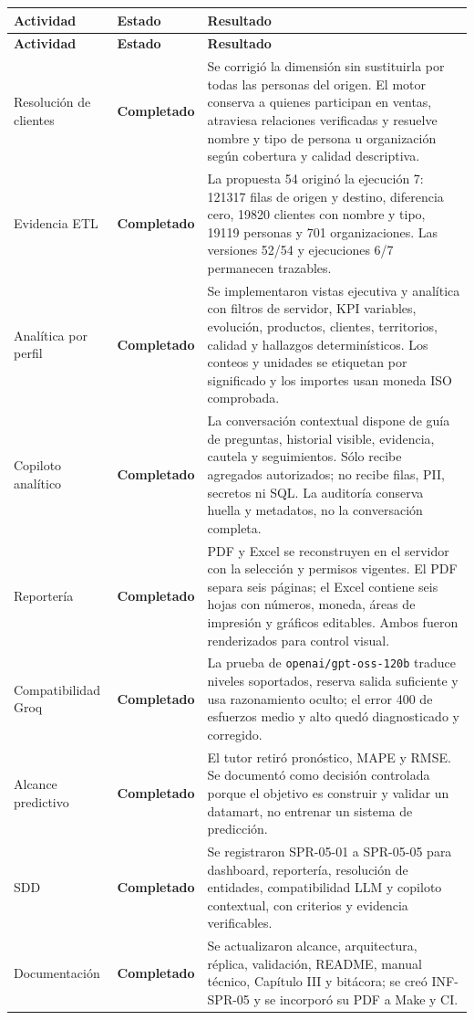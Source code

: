 \documentclass[11pt,letterpaper]{article}
\newcommand{\statusok}{\textcolor{deepgreen}{\textbf{Completado}}}
\newcommand{\file}[1]{\texttt{#1}}
\begin{document}
\begin{longtable}{@{}p{}p{}p{}@{}}
  \toprule
  \textbf{Actividad} & \textbf{Estado} & \textbf{Resultado} \\
  \midrule
  \endfirsthead
  \toprule
  \textbf{Actividad} & \textbf{Estado} & \textbf{Resultado} \\
  \midrule
  \endhead
  Resolución de clientes & \statusok & Se corrigió la dimensión sin sustituirla por todas las personas del origen. El motor conserva a quienes participan en ventas, atraviesa relaciones verificadas y resuelve nombre y tipo de persona u organización según cobertura y calidad descriptiva. \\
  Evidencia ETL & \statusok & La propuesta 54 originó la ejecución 7: 121317 filas de origen y destino, diferencia cero, 19820 clientes con nombre y tipo, 19119 personas y 701 organizaciones. Las versiones 52/54 y ejecuciones 6/7 permanecen trazables. \\
  Analítica por perfil & \statusok & Se implementaron vistas ejecutiva y analítica con filtros de servidor, KPI variables, evolución, productos, clientes, territorios, calidad y hallazgos determinísticos. Los conteos y unidades se etiquetan por significado y los importes usan moneda ISO comprobada. \\
  Copiloto analítico & \statusok & La conversación contextual dispone de guía de preguntas, historial visible, evidencia, cautela y seguimientos. Sólo recibe agregados autorizados; no recibe filas, PII, secretos ni SQL. La auditoría conserva huella y metadatos, no la conversación completa. \\
  Reportería & \statusok & PDF y Excel se reconstruyen en el servidor con la selección y permisos vigentes. El PDF separa seis páginas; el Excel contiene seis hojas con números, moneda, áreas de impresión y gráficos editables. Ambos fueron renderizados para control visual. \\
  Compatibilidad Groq & \statusok & La prueba de \file{openai/gpt-oss-120b} traduce niveles soportados, reserva salida suficiente y usa razonamiento oculto; el error 400 de esfuerzos medio y alto quedó diagnosticado y corregido. \\
  Alcance predictivo & \statusok & El tutor retiró pronóstico, MAPE y RMSE. Se documentó como decisión controlada porque el objetivo es construir y validar un datamart, no entrenar un sistema de predicción. \\
  SDD & \statusok & Se registraron SPR-05-01 a SPR-05-05 para dashboard, reportería, resolución de entidades, compatibilidad LLM y copiloto contextual, con criterios y evidencia verificables. \\
  Documentación & \statusok & Se actualizaron alcance, arquitectura, réplica, validación, README, manual técnico, Capítulo III y bitácora; se creó INF-SPR-05 y se incorporó su PDF a Make y CI. \\
  \bottomrule
\end{longtable}
\end{document}
